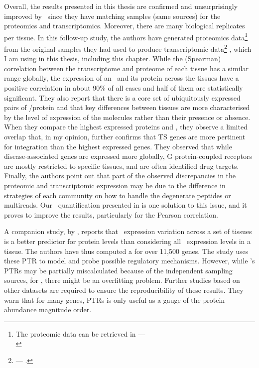 Overall, the results presented in this thesis
are confirmed and unsurprisingly improved by~\citet{Wang2019-ut}
since they have matching samples (same sources)
for the proteomics and transcriptomics.
Moreover, there are many biological replicates per tissue.
In this follow-up study, the authors have generated proteomics data\footnote{%
The proteomic data can be retrieved in
---\\ }
from the original samples they had used
to produce transcriptomic data\footnote{%
--- .}
, which I am using in this thesis, including this chapter.
While the (Spearman) correlation
between the transcriptome and proteome of each tissue
has a similar range globally,
the expression of an \mRNA\ and its protein across the tissues have
a positive correlation in
about 90\% of all cases and half of them are statistically significant.
They also report that there is
a core set of ubiquitously expressed pairs of \mRNA/protein
and that key differences between tissues are more characterised
by the level of expression of the molecules rather than their presence or absence.
When they compare the highest expressed proteins and \mRNAs,
they observe a limited overlap that, in my opinion,
further confirms that \gls{TS} genes are more pertinent for integration
than the highest expressed genes.
They observed that while disease-associated genes are expressed more globally,
G protein-coupled receptors are mostly restricted to specific tissues,
and are often identified drug targets.
Finally, the authors point out that part of the observed discrepancies
in the proteomic and transcriptomic expression
may be due to the difference in strategies of each community
on how to handle the degenerate peptides or multireads.
Our \PPKM\ quantification presented in 
is one solution to this issue,
and it proves to improve the results,
particularly for the Pearson correlation.\mybr\

A companion study, by \citet{Eraslan2019-md}, reports that
\mRNA\ expression variation across a set of tissues is
a better predictor for protein levels than
considering all \mRNAs\ expression levels in a tissue.
The authors have thus computed a  for over 11,500 genes.
The study uses these \gls{PTR} to model and probe possible regulatory mechanisms.
However, while \citet{Franks2017-bp}'s \glspl{PTR} may be partially miscalculated
because of the independent sampling sources,
for \citet{Eraslan2019-md}, there might be an overfitting problem.
Further studies based on other datasets are required
to ensure the reproducibility of these results.
They warn that for many genes,
\glspl{PTR} is only useful as a gauge of the protein abundance magnitude order.\mybr\

